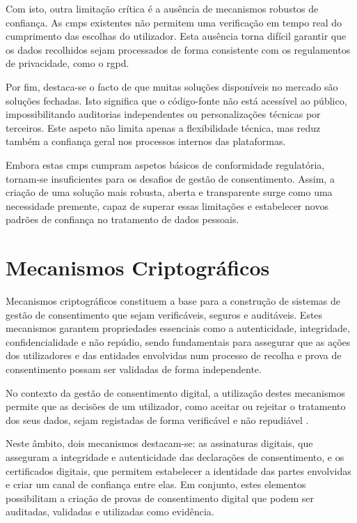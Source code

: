 Com isto, outra limitação crítica é a ausência de mecanismos robustos de confiança. As \acrshort{cmp}s existentes não permitem uma verificação em tempo real do cumprimento das escolhas do utilizador. Esta ausência torna difícil garantir que os dados recolhidos sejam processados de forma consistente com os regulamentos de privacidade, como o \acrshort{rgpd}.

Por fim, destaca-se o facto de que muitas soluções disponíveis no mercado são soluções fechadas. Isto significa que o código-fonte não está acessível ao público, impossibilitando auditorias independentes ou personalizações técnicas por terceiros. Este aspeto não limita apenas a flexibilidade técnica, mas reduz também a confiança geral nos processos internos das plataformas.

Embora estas \acrshort{cmp}s cumpram aspetos básicos de conformidade regulatória, tornam-se insuficientes para os desafios de gestão de consentimento. Assim, a criação de uma solução mais robusta, aberta e transparente surge como uma necessidade premente, capaz de superar essas limitações e estabelecer novos padrões de confiança no tratamento de dados pessoais.

\section{Mecanismos Criptográficos}

Mecanismos criptográficos constituem a base para a construção de sistemas de gestão de consentimento que sejam verificáveis, seguros e auditáveis. Estes mecanismos garantem propriedades essenciais como a autenticidade, integridade, confidencialidade e não repúdio, sendo fundamentais para assegurar que as ações dos utilizadores e das entidades envolvidas num processo de recolha e prova de consentimento possam ser validadas de forma independente.

No contexto da gestão de consentimento digital, a utilização destes mecanismos permite que as decisões de um utilizador, como aceitar ou rejeitar o tratamento dos seus dados, sejam registadas de forma verificável e não repudiável \citep{cryptoeprint:2024/1839}.

Neste âmbito, dois mecanismos destacam-se: as assinaturas digitais, que asseguram a integridade e autenticidade das declarações de consentimento, e os certificados digitais, que permitem estabelecer a identidade das partes envolvidas e criar um canal de confiança entre elas. Em conjunto, estes elementos possibilitam a criação de provas de consentimento digital que podem ser auditadas, validadas e utilizadas como evidência.


